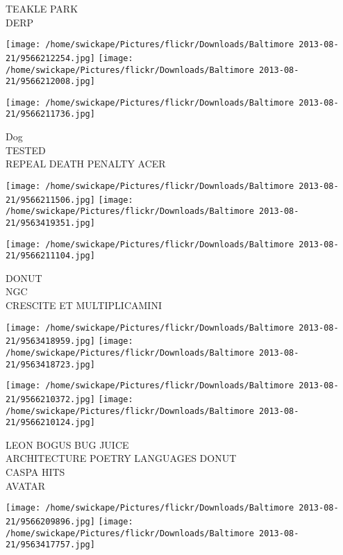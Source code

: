 \documentclass[10pt,letterpaper]{article}
\begin{document}
TEAKLE PARK\\
DERP\\
\pagebreak

\texttt{[image: /home/swickape/Pictures/flickr/Downloads/Baltimore 2013-08-21/9566212254.jpg]}
\texttt{[image: /home/swickape/Pictures/flickr/Downloads/Baltimore 2013-08-21/9566212008.jpg]}

\vspace{0.25in}
\texttt{[image: /home/swickape/Pictures/flickr/Downloads/Baltimore 2013-08-21/9566211736.jpg]}

Dog\\
TESTED\\
REPEAL DEATH PENALTY ACER\\
\pagebreak

\texttt{[image: /home/swickape/Pictures/flickr/Downloads/Baltimore 2013-08-21/9566211506.jpg]}
\texttt{[image: /home/swickape/Pictures/flickr/Downloads/Baltimore 2013-08-21/9563419351.jpg]}

\vspace{0.25in}
\texttt{[image: /home/swickape/Pictures/flickr/Downloads/Baltimore 2013-08-21/9566211104.jpg]}

DONUT\\
NGC\\
CRESCITE ET MULTIPLICAMINI\\
\pagebreak

\texttt{[image: /home/swickape/Pictures/flickr/Downloads/Baltimore 2013-08-21/9563418959.jpg]}
\texttt{[image: /home/swickape/Pictures/flickr/Downloads/Baltimore 2013-08-21/9563418723.jpg]}

\texttt{[image: /home/swickape/Pictures/flickr/Downloads/Baltimore 2013-08-21/9566210372.jpg]}
\texttt{[image: /home/swickape/Pictures/flickr/Downloads/Baltimore 2013-08-21/9566210124.jpg]}

LEON BOGUS BUG JUICE\\
ARCHITECTURE POETRY LANGUAGES DONUT\\
CASPA HITS\\
AVATAR\\
\pagebreak

\texttt{[image: /home/swickape/Pictures/flickr/Downloads/Baltimore 2013-08-21/9566209896.jpg]}
\texttt{[image: /home/swickape/Pictures/flickr/Downloads/Baltimore 2013-08-21/9563417757.jpg]}
\end{document}
